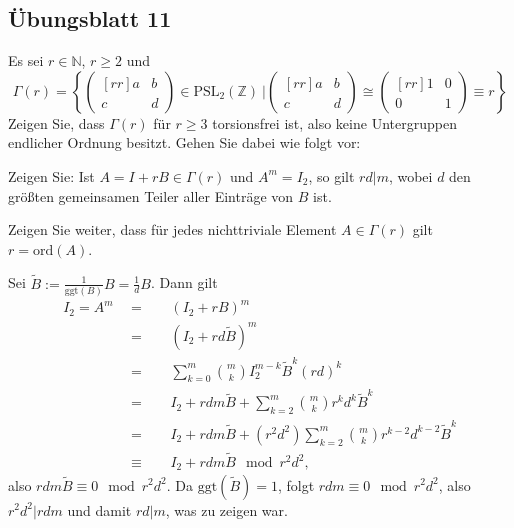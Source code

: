 \documentclass[11pt]{book}
\numberwithin{dummy}{section}
\theoremstyle{nonumberbreak}
\newenvironment{prob}[1][]{\ifthenelse{\equal{#1}{}}{\problem}{\problem[#1]}\rm}{\endproblem}
\newenvironment{sol}[1][]{\ifthenelse{\equal{#1}{}}{\solution}{\solution[#1]}\rm}{\endsolution}
\newcommand{\Z}{\mathbb{Z}}
\newcommand{\matx}[4]{\begin{pmatrix}[rr]#1 & #2 \\[-6pt] #3 & #4 \end{pmatrix}}
\begin{document}
\begin{spacing}{1.4}
\begin{prob}
\end{prob}






















\newpage




\titlespacing*{\section}{-16.5pt}{0pt}{20pt}
\renewcommand*\thesection{}
\section{Übungsblatt 11} %
\renewcommand*\thesection{\arabic{section}}



\begin{prob}   %
Es sei $r \in \mathbb{N}$, $r \geqslant 2$ und 
$$\Gamma(r)= \left\{ \matx{a}{b}{c}{d}\in \mathrm{PSL}_2(\Z) \ \Bigg \vert \matx{a}{b}{c}{d} \cong \matx{1}{0}{0}{1} \equiv r \right\}$$
Zeigen Sie, dass $\Gamma(r)$ für $r \geqslant 3$ torsionsfrei ist, also keine Untergruppen endlicher Ordnung besitzt. Gehen Sie dabei wie folgt vor:
\begin{compactenum}
\item Zeigen Sie: Ist $A=I+ rB \in \Gamma(r)$ und $A^m=I_2$, so gilt $rd \vert m$, wobei $d$ den größten gemeinsamen Teiler aller Einträge von $B$ ist.
\item Zeigen Sie weiter, dass für jedes nichttriviale Element $A\in \Gamma(r)$ gilt $r=\mathrm{ord}(A)$.
\end{compactenum}


\begin{sol}
\begin{compactenum}
\item Sei $\tilde{B}:= \frac{1}{\mathrm{ggt}(B)} B = \frac{1}{d}B$. Dann gilt 
\begin{alignat*}{5}
I_2 = A^m \ \ &=&& \ \ (I_2+rB)^m\\
&=&& \ \ (I_2+rd\tilde{B})^m \\
&=&& \ \ \sum_{k=0}^m \binom{m}{k} I_2^{m-k} \tilde{B}^k (rd)^k \\
&=&& \ \ I_2 + rdm\tilde{B} + \sum_{k=2}^m \binom{m}{k} r^kd^k \tilde{B}^k \\
&=&& \ \ I_2 + rdm \tilde{B} + (r^2d^2) \sum_{k=2}^m \binom{m}{k} r^{k-2}d^{k-2} \tilde{B}^k \\
&\equiv&& \ \ I_2 + rdm \tilde{B} \mod r^2d^2,
\end{alignat*}
also $rdm \tilde{B} \equiv 0 \mod r^2d^2$. Da $\mathrm{ggt}(\tilde{B})=1$, folgt $rdm \equiv 0 \mod r^2d^2$, also $r^2d^2 \vert rdm$ und damit $rd \vert m$, was zu zeigen war.


\end{compactenum}
\end{sol}
\end{prob}
\end{spacing}
\end{document}

